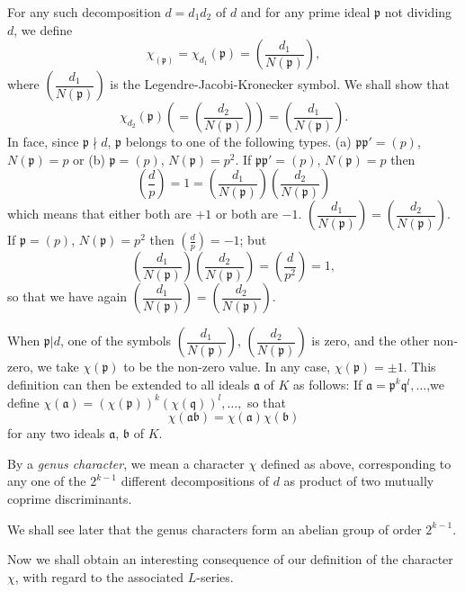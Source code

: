 For any such decomposition $d=d_{1}d_{2}$ of $d$ and for any prime
ideal $\mathfrak{p}$ not dividing $d$, we define
$$
\chi_(\mathfrak{p})= \chi_{d_{1}}(\mathfrak{p})=\left(\frac{d_{1}}{N(\mathfrak{p})}\right),
$$
where $\left(\dfrac{d_{1}}{N(\mathfrak{p})}\right)$ is the
Legendre-Jacobi-Kronecker symbol. We shall show that
$$
\chi_{d_2} (\mathfrak{p})
\left(=\left(\frac{d_{2}}{N(\mathfrak{p})}\right) \right)
=\left(\frac{d_{1}}{N(\mathfrak{p})}\right).  
$$
In face, since $\mathfrak{p} \nmid d$, $\mathfrak{p}$ belongs to one
of the following types. (a) $\mathfrak{p}\mathfrak{p}'=(p)$,
$N(\mathfrak{p})=p$ or (b) $\mathfrak{p}=(p)$,
$N(\mathfrak{p})=p^{2}$. If $\mathfrak{p}\mathfrak{p}'=(p)$,
$N(\mathfrak{p})=p$ then 
$$
\left(\frac{d}{p}\right)=1=\left(\frac{d_{1}}{N(\mathfrak{p})}\right)\left(\dfrac{d_{2}}{N(\mathfrak{p})}\right) 
$$
which means that either both are $+1$ or both are $-1$. \ie
$\left(\dfrac{d_{1}}{N(\mathfrak{p})}\right) = 
\left(\dfrac{d_{2}}{N(\mathfrak{p})}\right)$. If
$\mathfrak{p}=(p)$, $N(\mathfrak{p})=p^{2}$ then
$\left(\frac{d}{p}\right)=-1$; but
$$
\left(\frac{d_{1}}{N(\mathfrak{p})}\right)\left(\frac{d_{2}}{N(\mathfrak{p})}\right)=\left(\frac{d}{p^{2}}\right)=1,
$$
so that we have again
$\left(\dfrac{d_{1}}{N(\mathfrak{p})}\right)=\left(\dfrac{d_{2}}{N(\mathfrak{p})}\right)$. 

When $\mathfrak{p}|d$, one of the symbols
$\left(\dfrac{d_{1}}{N(\mathfrak{p})}\right)$,
$\left(\dfrac{d_{2}}{N(\mathfrak{p})}\right)$ is zero, and the other
non-zero, we take $\chi(\mathfrak{p})$ to be the non-zero value. In
any case, $\chi(\mathfrak{p})=\pm 1$. This definition can then be
extended to all ideals $\mathfrak{a}$ of $K$ as follows: If 
$\mathfrak{a}=\mathfrak{p}^{k}\mathfrak{q}^{l},\ldots$,\pageoriginale we define
$\chi(\mathfrak{a})=(\chi(\mathfrak{p}))^{k}(\chi(\mathfrak{q}))^{l},\ldots,$
so that
$$
\chi(\mathfrak{a}\mathfrak{b})=\chi(\mathfrak{a})\chi(\mathfrak{b})
$$
for any two ideals $\mathfrak{a}$, $\mathfrak{b}$ of $K$.

By a {\em genus character}, we mean a character $\chi$ defined as
above, corresponding to any one of the $2^{k-1}$ different
decompositions of $d$ as product of two mutually coprime
discriminants.

We shall see later that the genus characters form an abelian group of
order $2^{k-1}$.

Now we shall obtain an interesting consequence of our definition of
the character $\chi$, with regard to the associated $L$-series.


